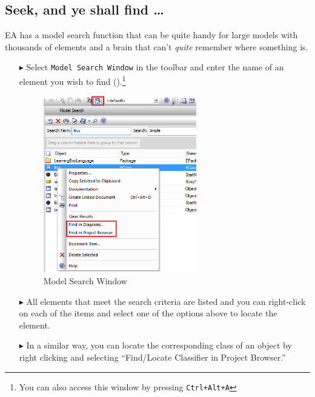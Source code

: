 \newpage

\hypertarget{subsec:seekAndFind}{}

\subsection{Seek, and ye shall find \ldots}

EA has a model search function that can be quite handy for large models with thousands of elements and a brain that can't \emph{quite} remember where something
is.

\begin{enumerate}

\item[$\blacktriangleright$]Select \texttt{Model Search Window} in the toolbar and enter the name of an element you wish to find
().\footnote{You can also access this window by pressing
\texttt{Ctrl+Alt+A}}

\vspace{0.5cm}

\begin{figure}[htbp]
\begin{center}
  \includegraphics[width=0.63\textwidth]{search1}
  \caption{Model Search Window}  
  \label{fig_search01}
\end{center}
\end{figure}

\item[$\blacktriangleright$] All elements that meet the search criteria are listed and you can right-click on each of the items and select one of the options
above to locate the element.

\item[$\blacktriangleright$] In a similar way, you can locate the corresponding class of an object by right clicking and selecting ``Find/Locate Classifier in
Project Browser.''

\vfill

\end{enumerate}

